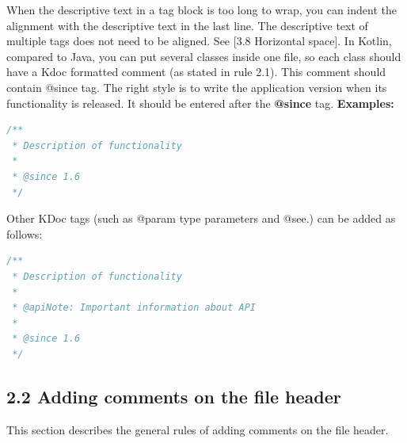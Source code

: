 When the descriptive text in a tag block is too long to wrap, you can indent the alignment with the descriptive text in the last line. The descriptive text of multiple tags does not need to be aligned.
See [3.8 Horizontal space].
In Kotlin, compared to Java, you can put several classes inside one file, so each class should have a Kdoc formatted comment (as stated in rule 2.1).
This comment should contain @since tag. The right style is to write the application version when its functionality is released. It should be entered after the \textbf{@since} tag.
\textbf{Examples:}
\begin{lstlisting}[language=Kotlin]
/**
 * Description of functionality
 *
 * @since 1.6
 */
\end{lstlisting}
Other KDoc tags (such as @param type parameters and @see.) can be added as follows:
\begin{lstlisting}[language=Kotlin]
/**
 * Description of functionality
 *
 * @apiNote: Important information about API
 *
 * @since 1.6
 */
\end{lstlisting}
\subsection*{\textbf{2.2 Adding comments on the file header}}
\label{sec:2.2}
This section describes the general rules of adding comments on the file header.
